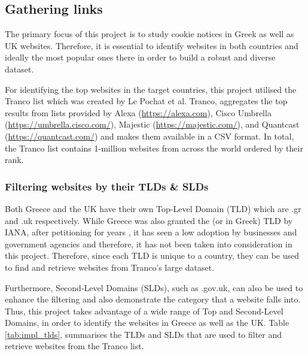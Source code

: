 \documentclass[../main.tex]{subfiles}
\begin{document}
\subsection{Gathering links}
The primary focus of this project is to study cookie notices in Greek as well as UK websites. Therefore, it is essential to identify websites in both countries and ideally the most popular ones there in order to build a robust and diverse dataset.

For identifying the top websites in the target countries, this project utilised the Tranco list which was created by Le Pochat et al. Tranco, aggregates the top results from lists provided by Alexa (\url{https://alexa.com}), Cisco Umbrella (\url{https://umbrella.cisco.com/}), Majestic (\url{https://majestic.com/}), and Quantcast (\url{https://quantcast.com/}) and makes them available in a CSV format. In total, the Tranco list contains 1-million websites from across the world ordered by their rank.

\subsubsection{Filtering websites by their TLDs \& SLDs}
Both Greece and the UK have their own Top-Level Domain (TLD) which are .gr and .uk respectively. While Greece was also granted the  (or  in Greek) TLD by IANA, after petitioning for years \cite{iana_el}, it has seen a low adoption by businesses and government agencies and therefore, it has not been taken into consideration in this project. Therefore, since each TLD is unique to a country, they can be used to find and retrieve websites from Tranco’s large dataset. 

Furthermore, Second-Level Domains (SLDs), such as .gov.uk, can also be used to enhance the filtering and also demonstrate the category that a website falls into. Thus, this project takes advantage of a wide range of Top and Second-Level Domains, in order to identify the websites in Greece as well as the UK. Table \ref{tab:impl_tlds}, summarises the TLDs and SLDs that are used to filter and retrieve websites from the Tranco list.
\end{document}
